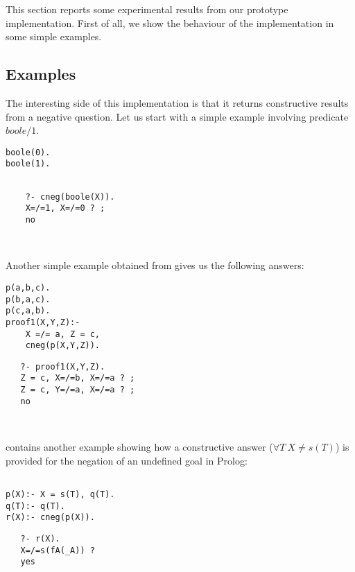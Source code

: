 \documentclass{llncs}
\begin{document}
This section reports some experimental results from our prototype
implementation.  First of all, we show the behaviour of the
implementation in some simple examples.


\subsection{Examples}
\label{examples}

The interesting side of this implementation is that it returns
constructive results from a negative question. Let us start with a
simple example involving predicate $boole/1$.
{\small
\begin{minipage}{2in}
\begin{verbatim}
boole(0).
boole(1).
\end{verbatim}
\end{minipage}
\begin{minipage}{2in}
\begin{verbatim} 

    ?- cneg(boole(X)).
    X=/=1, X=/=0 ? ;
    no

\end{verbatim} 
\end{minipage}\\
}
Another simple example obtained from \cite{Stuckey95} gives us the
following answers:

{\small
\begin{minipage}{2in}
\begin{verbatim}
p(a,b,c).
p(b,a,c).
p(c,a,b).
proof1(X,Y,Z):-
    X =/= a, Z = c,
    cneg(p(X,Y,Z)).

\end{verbatim}
\end{minipage}
\begin{minipage}{2in}
\begin{verbatim} 
   ?- proof1(X,Y,Z).
   Z = c, X=/=b, X=/=a ? ;
   Z = c, Y=/=a, X=/=a ? ;
   no
\end{verbatim} 
\end{minipage}\\
}
\cite{Stuckey95} contains another example showing how a constructive
answer ($\forall T ~ X \neq s(T)$) is provided for the negation of an
undefined goal in Prolog:

{\small
\begin{minipage}{2in}
\begin{verbatim}

p(X):- X = s(T), q(T).
q(T):- q(T).
r(X):- cneg(p(X)).
\end{verbatim}
\end{minipage}
\begin{minipage}{2in}
\begin{verbatim} 
   ?- r(X).
   X=/=s(fA(_A)) ?
   yes
\end{verbatim} 
\end{minipage}\\
}
\end{document}
